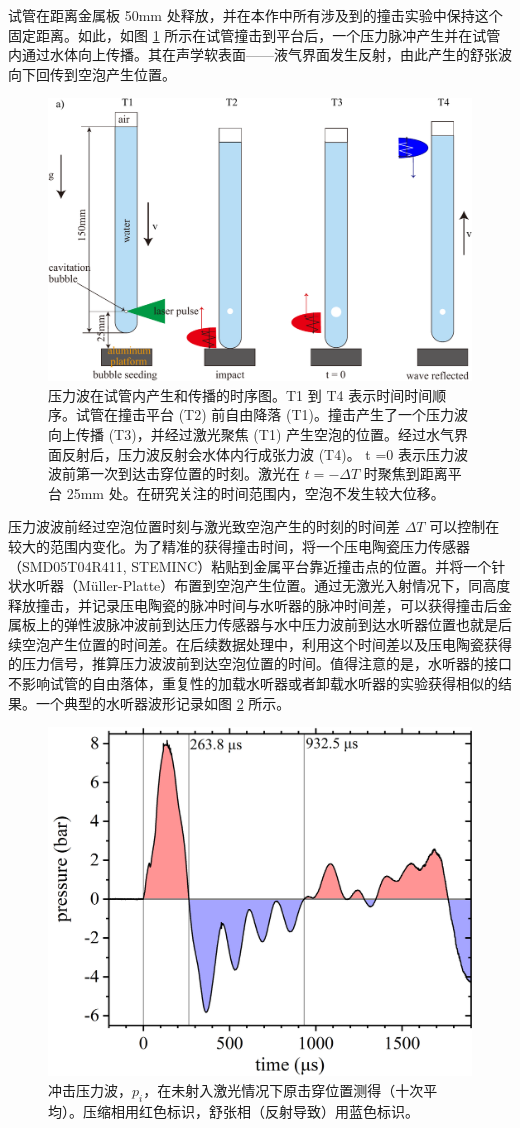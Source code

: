 试管在距离金属板 50mm
处释放，并在本作中所有涉及到的撞击实验中保持这个固定距离。如此，如图 \ref{fig:5.3}
所示在试管撞击到平台后，一个压力脉冲产生并在试管内通过水体向上传播。其在声学软表面------液气界面发生反射，由此产生的舒张波向下回传到空泡产生位置。

\begin{figure}[H]
  \centering
  \includegraphics[width=0.6\linewidth]{img/fig5.3-eps-converted-to.pdf}
  \caption[压力波在试管内产生和传播的时序图]{压力波在试管内产生和传播的时序图。T1 到 T4
表示时间时间顺序。试管在撞击平台 (T2) 前自由降落
(T1)。撞击产生了一个压力波向上传播 (T3)，并经过激光聚焦 (T1)
产生空泡的位置。经过水气界面反射后，压力波反射会水体内行成张力波 (T4)。
t =0 表示压力波波前第一次到达击穿位置的时刻。激光在 $t=-\Delta T$
时聚焦到距离平台 25mm 处。在研究关注的时间范围内，空泡不发生较大位移。}
  \label{fig:5.3}
\end{figure}


压力波波前经过空泡位置时刻与激光致空泡产生的时刻的时间差 $\Delta T$
可以控制在较大的范围内变化。为了精准的获得撞击时间，将一个压电陶瓷压力传感器（SMD05T04R411,
STEMINC）粘贴到金属平台靠近撞击点的位置。并将一个针状水听器（Müller-Platte）布置到空泡产生位置。通过无激光入射情况下，同高度释放撞击，并记录压电陶瓷的脉冲时间与水听器的脉冲时间差，可以获得撞击后金属板上的弹性波脉冲波前到达压力传感器与水中压力波前到达水听器位置也就是后续空泡产生位置的时间差。在后续数据处理中，利用这个时间差以及压电陶瓷获得的压力信号，推算压力波波前到达空泡位置的时间。值得注意的是，水听器的接口不影响试管的自由落体，重复性的加载水听器或者卸载水听器的实验获得相似的结果。一个典型的水听器波形记录如图
\ref{fig:5.4} 所示。

\begin{figure}[H]
  \centering
  \includegraphics[width=0.6\linewidth]{img/fig5.4.png}
  \caption[冲击压力波，$p_i$，在未射入激光情况下原击穿位置测得（十次平均）]{冲击压力波，$p_i$，在未射入激光情况下原击穿位置测得（十次平均）。压缩相用红色标识，舒张相（反射导致）用蓝色标识。}
  \label{fig:5.4}
\end{figure}

